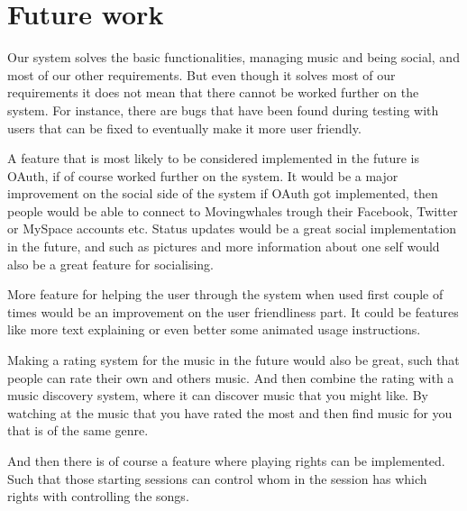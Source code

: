 \section{Future work}
Our system solves the basic functionalities, managing music and being social, and most of our other requirements. But even though it solves most of our requirements it does not mean that there cannot be worked further on the system. For instance, there are bugs that have been found during testing with users that can be fixed to eventually make it more user friendly.

A feature that is most likely to be considered implemented in the future is OAuth, if of course worked further on the system. It would be a major improvement on the social side of the system if OAuth got implemented, then people would be able to connect to Movingwhales trough their Facebook, Twitter or MySpace accounts etc. Status updates would be a great social implementation in the future, and such as pictures and more information about one self would also be a great feature for socialising.  

More feature for helping the user through the system when used first couple of times would be an improvement on the user friendliness part. It could be features like more text explaining or even better some animated usage instructions.

Making a rating system for the music in the future would also be great, such that people can rate their own and others music. And then combine the rating with a music discovery system, where it can discover music that you might like. By watching at the music that you have rated the most and then find music for you that is of the same genre.

And then there is of course a feature where playing rights can be implemented. Such that those starting sessions can control whom in the session has which rights with controlling the songs.